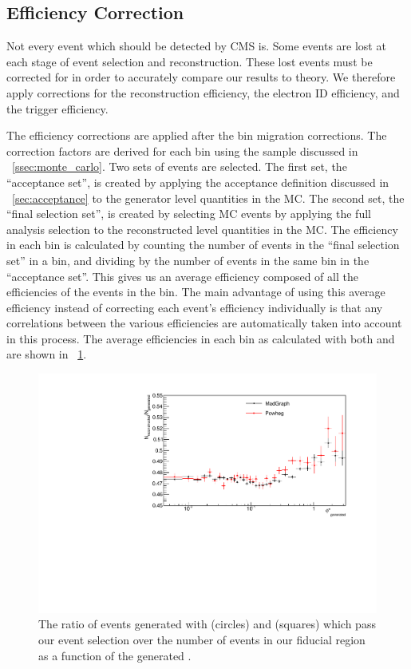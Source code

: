 \subsection{Efficiency Correction}

Not every event which should be detected by CMS is. Some events are lost at
each stage of event selection and reconstruction. These lost events must be
corrected for in order to accurately compare our results to theory. We
therefore apply corrections for the reconstruction efficiency, the electron ID
efficiency, and the trigger efficiency.

The efficiency corrections are applied after the bin migration corrections. The
correction factors are derived for each \phistar bin using the \Ztoee \MADGRAPH
sample discussed in \SEC~\ref{ssec:monte_carlo}. Two sets of events are
selected. The first set, the ``acceptance set'', is created by applying the
acceptance definition discussed in \SEC~\ref{sec:acceptance} to the generator
level quantities in the MC. The second set, the ``final selection set'', is
created by selecting MC events by applying the full analysis selection to the
reconstructed level quantities in the MC. The efficiency in each \phistar bin
is calculated by counting the number of events in the ``final selection set''
in a bin, and dividing by the number of events in the same bin in the
``acceptance set''. This gives us an average efficiency composed of all the
efficiencies of the events in the bin. The main advantage of using this average
efficiency instead of correcting each event's efficiency individually is that
any correlations between the various efficiencies are automatically taken into
account in this process. The average efficiencies in each bin as calculated with
both \MADGRAPH and \POWHEG are shown in \FIG~\ref{fig:average_efficiencies}.

\begin{figure}[!htbp]
    \centering
    \includegraphics[width=\textwidth]{figures/EventEff.pdf}
    \caption{
        The ratio of \Ztoee events generated with \MADGRAPH (circles) and
        \POWHEG (squares) which pass our event selection over the number of
        events in our fiducial region as a function of the generated \phistar.
    }
    \label{fig:average_efficiencies}
\end{figure}
